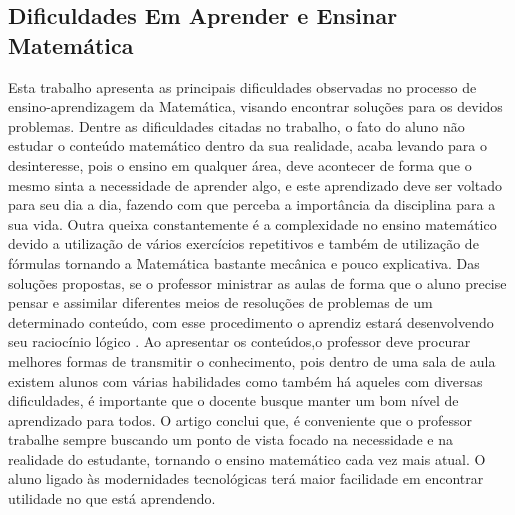 \documentclass[12pt,a4paper]{article}
\begin{document}
\subsection{Dificuldades Em Aprender e Ensinar Matemática}
Esta trabalho apresenta as principais dificuldades observadas no processo de ensino-aprendizagem da Matemática, visando encontrar soluções para os devidos problemas.
Dentre as dificuldades citadas no trabalho, o fato do aluno não estudar o conteúdo matemático dentro da sua realidade, acaba levando para o desinteresse, pois o ensino em qualquer área, deve acontecer de forma que o mesmo sinta a necessidade de aprender algo, e este aprendizado deve ser voltado para seu dia a dia, fazendo com que perceba a importância da disciplina para a sua vida. 
Outra queixa constantemente é a complexidade no ensino matemático devido a utilização de vários exercícios repetitivos e também de utilização de fórmulas tornando a Matemática bastante mecânica e pouco explicativa. 
Das soluções propostas, se o professor ministrar as aulas de forma que o aluno precise pensar e assimilar diferentes meios de resoluções de problemas de um determinado conteúdo, com esse procedimento o aprendiz estará desenvolvendo seu raciocínio lógico . Ao apresentar os conteúdos,o professor deve procurar melhores formas de transmitir o conhecimento, pois dentro de uma sala de aula existem alunos com várias habilidades como também há aqueles com diversas dificuldades, é importante que o docente busque manter um bom nível de aprendizado para todos.
O artigo conclui que, é conveniente que o professor trabalhe sempre buscando um ponto de vista focado na necessidade e na realidade do estudante, tornando o ensino matemático cada vez mais atual. O aluno ligado às modernidades tecnológicas terá maior facilidade em encontrar utilidade no que está aprendendo.
\end{document}
